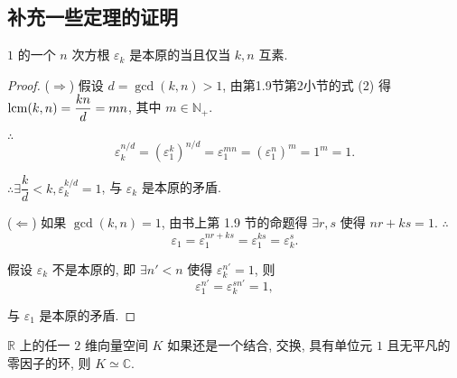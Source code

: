 \documentclass[color=black,device=normal,lang=cn,mode=geye]{elegantnote}
\begin{document}
\subsection{补充一些定理的证明}
\begin{theorem}
    $1$ 的一个 $n$ 次方根 $\varepsilon_k$ 是本原的当且仅当 $k,n$ 互素.
\end{theorem}
\begin{proof}
    ($\Rightarrow$) 假设 $d=\operatorname{gcd}(k,n)>1$, 由第1.9节第2小节的式 (2) 得 $\operatorname{lcm} (k,n)=\dfrac{kn}{d}=mn$, 其中 $m\in\mathbb{N}_+$.

    $\therefore$
    \[\varepsilon_k^{n/d}=(\varepsilon_1^k)^{n/d}=\varepsilon_1^{mn}=(\varepsilon_1^n)^m=1^m=1.\]

    $\therefore\exists\dfrac{k}{d}<k,\varepsilon_k^{k/d}=1$, 与 $\varepsilon_k$ 是本原的矛盾.

    ($\Leftarrow$) 如果 $\gcd(k,n)=1$, 由书上第 1.9 节的命题得 $\exists r,s$ 使得 $nr+ks=1$. $\therefore$
    \[\varepsilon_1=\varepsilon_1^{nr+ks}=\varepsilon_1^{ks}=\varepsilon_k^s.\]

    假设 $\varepsilon_k$ 不是本原的, 即 $\exists n'<n$ 使得 $\varepsilon_k^{n'}=1$, 则
    \[\varepsilon_1^{n'}=\varepsilon_k^{sn'}=1,\]

    与 $\varepsilon_1$ 是本原的矛盾.
\end{proof}
\begin{theorem}[书上的定理4]
    $\mathbb{R}$ 上的任一 $2$ 维向量空间 $K$ 如果还是一个结合, 交换, 具有单位元 $1$ 且无平凡的零因子的环, 则 $K\simeq\mathbb{C}$.
\end{theorem}
\end{document}
